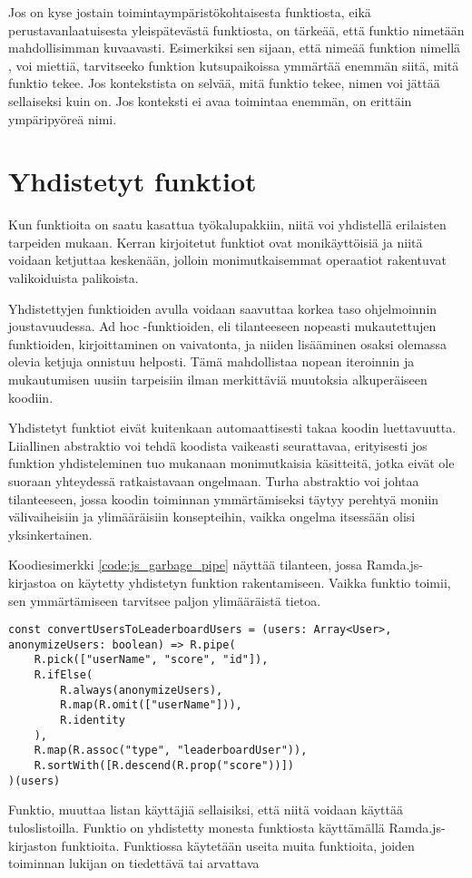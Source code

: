 Jos on kyse jostain toimintaympäristökohtaisesta funktiosta, eikä perustavanlaatuisesta yleispätevästä funktiosta, on tärkeää, että funktio nimetään mahdollisimman kuvaavasti. Esimerkiksi sen sijaan, että nimeää funktion nimellä , voi miettiä, tarvitseeko funktion kutsupaikoissa ymmärtää enemmän siitä, mitä funktio tekee. Jos kontekstista on selvää, mitä funktio tekee, nimen voi jättää sellaiseksi kuin on. Jos konteksti ei avaa toimintaa enemmän,  on erittäin ympäripyöreä nimi.

\section{Yhdistetyt funktiot}

Kun funktioita on saatu kasattua työkalupakkiin, niitä voi yhdistellä erilaisten tarpeiden mukaan. Kerran kirjoitetut funktiot ovat monikäyttöisiä ja niitä voidaan ketjuttaa keskenään, jolloin monimutkaisemmat operaatiot rakentuvat valikoiduista palikoista.

Yhdistettyjen funktioiden avulla voidaan saavuttaa korkea taso ohjelmoinnin joustavuudessa. Ad hoc -funktioiden, eli tilanteeseen nopeasti mukautettujen funktioiden, kirjoittaminen on vaivatonta, ja niiden lisääminen osaksi olemassa olevia ketjuja onnistuu helposti. Tämä mahdollistaa nopean iteroinnin ja mukautumisen uusiin tarpeisiin ilman merkittäviä muutoksia alkuperäiseen koodiin.

Yhdistetyt funktiot eivät kuitenkaan automaattisesti takaa koodin luettavuutta. Liiallinen abstraktio voi tehdä koodista vaikeasti seurattavaa, erityisesti jos funktion yhdisteleminen tuo mukanaan monimutkaisia käsitteitä, jotka eivät ole suoraan yhteydessä ratkaistavaan ongelmaan. Turha abstraktio voi johtaa tilanteeseen, jossa koodin toiminnan ymmärtämiseksi täytyy perehtyä moniin välivaiheisiin ja ylimääräisiin konsepteihin, vaikka ongelma itsessään olisi yksinkertainen.

Koodiesimerkki \ref{code:js_garbage_pipe} näyttää tilanteen, jossa Ramda.js-kirjastoa on käytetty yhdistetyn funktion rakentamiseen. Vaikka funktio toimii, sen ymmärtämiseen tarvitsee paljon ylimääräistä tietoa.

\begin{code}
    \begin{verbatim}
const convertUsersToLeaderboardUsers = (users: Array<User>, anonymizeUsers: boolean) => R.pipe(
    R.pick(["userName", "score", "id"]),
    R.ifElse(
        R.always(anonymizeUsers), 
        R.map(R.omit(["userName"])), 
        R.identity
    ),
    R.map(R.assoc("type", "leaderboardUser")),
    R.sortWith([R.descend(R.prop("score"))])
)(users)
\end{verbatim}
    \caption{Funktio, muuttaa listan käyttäjiä sellaisiksi, että niitä voidaan käyttää tuloslistoilla. Funktio on yhdistetty monesta funktiosta käyttämällä Ramda.js-kirjaston funktioita. Funktiossa käytetään useita muita funktioita, joiden toiminnan lukijan on tiedettävä tai arvattava}
    \label{code:js_garbage_pipe}
\end{code}

